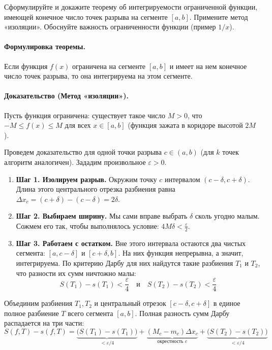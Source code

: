 {Сформулируйте и докажите теорему об интегрируемости ограниченной функции, имеющей конечное число точек разрыва на сегменте $[a, b]$. Примените метод «изоляции». Обоснуйте важность ограниченности функции (пример $1/x$).}

\paragraph{Формулировка теоремы.}
Если функция $f(x)$ ограничена на сегменте $[a, b]$ и имеет на нем конечное число точек разрыва, то она интегрируема на этом сегменте.

\paragraph{Доказательство (Метод «изоляции»).}
Пусть функция ограничена: существует такое число $M>0$, что $-M \le f(x) \le M$ для всех $x \in [a,b]$ (функция зажата в коридоре высотой $2M$). 

Проведем доказательство для одной точки разрыва $c \in (a, b)$ (для $k$ точек алгоритм аналогичен). Зададим произвольное $\varepsilon > 0$.

\begin{enumerate}
    \item \textbf{Шаг 1. Изолируем разрыв.} Окружим точку $c$ интервалом $(c - \delta, c + \delta)$. Длина этого центрального отрезка разбиения равна $\Delta x_c = (c + \delta) - (c - \delta) = 2\delta$.
    \item \textbf{Шаг 2. Выбираем ширину.} Мы сами вправе выбрать $\delta$ сколь угодно малым. Сожмем его так, чтобы выполнялось условие: $4M\delta < \frac{\varepsilon}{2}$.
    \item \textbf{Шаг 3. Работаем с остатком.} Вне этого интервала остаются два чистых сегмента: $[a, c - \delta]$ и $[c + \delta, b]$. На них функция непрерывна, а значит, интегрируема. По критерию Дарбу для них найдутся такие разбиения $T_1$ и $T_2$, что разности их сумм ничтожно малы:
    $$ S(T_1) - s(T_1) < \frac{\varepsilon}{4} \quad \text{и} \quad S(T_2) - s(T_2) < \frac{\varepsilon}{4} $$
\end{enumerate}

Объединим разбиения $T_1, T_2$ и центральный отрезок $[c - \delta, c + \delta]$ в единое полное разбиение $T$ всего сегмента $[a, b]$. Полная разность сумм Дарбу распадается на три части:
$$ S(f, T) - s(f, T) = \underbrace{\big(S(T_1) - s(T_1)\big)}_{< \varepsilon/4} + \underbrace{(M_c - m_c)\Delta x_c}_{\text{окрестность } c} + \underbrace{\big(S(T_2) - s(T_2)\big)}_{< \varepsilon/4} $$

